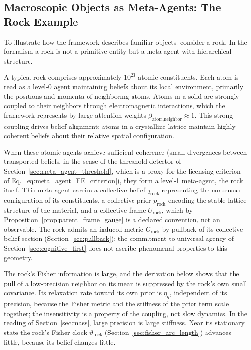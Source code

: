 \subsection{Macroscopic Objects as Meta-Agents: The Rock Example}

To illustrate how the framework describes familiar objects, consider a rock. In the formalism a rock is not a primitive entity but a meta-agent with hierarchical structure.

A typical rock comprises approximately $10^{23}$ atomic constituents. Each atom is read as a level-0 agent maintaining beliefs about its local environment, primarily the positions and momenta of neighboring atoms. Atoms in a solid are strongly coupled to their neighbors through electromagnetic interactions, which the framework represents by large attention weights $\beta_{\text{atom,neighbor}} \approx 1$. This strong coupling drives belief alignment: atoms in a crystalline lattice maintain highly coherent beliefs about their relative spatial configuration.

When these atomic agents achieve sufficient coherence (small divergences between transported beliefs, in the sense of the threshold detector of Section~\ref{sec:meta_agent_threshold}, which is a proxy for the licensing criterion of Eq.~\eqref{eq:meta_agent_FE_criterion}), they form a level-1 meta-agent, the rock itself. This meta-agent carries a collective belief $q_{\text{rock}}$ representing the consensus configuration of its constituents, a collective prior $p_{\text{rock}}$ encoding the stable lattice structure of the material, and a collective frame $U_{\text{rock}}$, which by Proposition~\ref{prop:parent_frame_gauge} is a declared convention, not an observable. The rock admits an induced metric $G_{\text{rock}}$ by pullback of its collective belief section (Section~\ref{sec:pullback}); the commitment to universal agency of Section~\ref{sec:cognitive_first} does not ascribe phenomenal properties to this geometry.

The rock's Fisher information is large, and the derivation below shows that the pull of a low-precision neighbor on its mean is suppressed by the rock's own small covariance. Its relaxation rate toward its own prior is $\eta_q$, independent of its precision, because the Fisher metric and the stiffness of the prior term scale together; the insensitivity is a property of the coupling, not slow dynamics. In the reading of Section~\ref{sec:mass}, large precision is large stiffness. Near its stationary state the rock's Fisher clock $\vartheta_{\text{rock}}$ (Section~\ref{sec:fisher_arc_length}) advances little, because its belief changes little.

